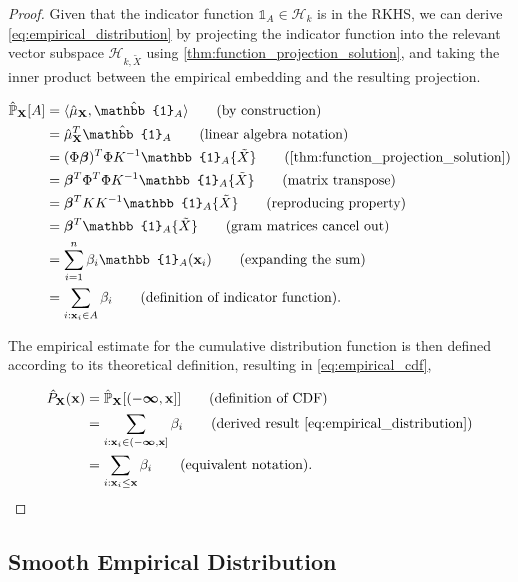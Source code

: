 \documentclass[twoside]{article} \usepackage{aistats2017}
\theoremstyle{definition}
\theoremstyle{theorem}
\newcommand{\rv}[1]{{#1}}
\newcommand{\ds}[1]{\tilde{#1}}
\newcommand{\inner}[2]{{\langle #1, #2 \rangle}}
\begin{document}
		\begin{proof}
			Given that the indicator function $\mathbb{1}_{A} \in \mathcal{H}_{k}$ is in the RKHS, we can derive \eqref{eq:empirical_distribution} by projecting the indicator function into the relevant vector subspace $\mathcal{H}_{k, \ds{X}}$ using \cref{thm:function_projection_solution}, and taking the inner product between the empirical embedding and the resulting projection. 

			\begin{align*}
				\hat{\mathbb{P}}_{\bvec{\rv{X}}}[A] &= \inner{\hat{\mu}_{\bvec{\rv{X}}}}{ \hat{\mathbb{1}}_{A}} \tag{by construction} \\
				&= \hat{\mu}_{\bvec{\rv{X}}}^{T}\hat{\mathbb{1}}_{A} \tag{linear algebra notation} \\
				&= (\Phi \bm{\beta})^{T} \Phi K^{-1} \mathbb{1}_{A}\{\ds{X}\} \tag{\cref{thm:function_projection_solution}} \\
				&= \bm{\beta}^{T} \Phi^{T} \Phi K^{-1} \mathbb{1}_{A}\{\ds{X}\} \tag{matrix transpose} \\
				&= \bm{\beta}^{T} K K^{-1} \mathbb{1}_{A}\{\ds{X}\} \tag{reproducing property} \\
				&= \bm{\beta}^{T} \mathbb{1}_{A}\{\ds{X}\} \tag{gram matrices cancel out} \\
				&= \sum_{i = 1}^{n} \beta_{i} \mathbb{1}_{A}(\bvec{x}_{i}) \tag{expanding the sum} \\
				&= \sum_{i : \bvec{x}_{i} \in A} \beta_{i} \tag{definition of indicator function}.
			\end{align*}

			The empirical estimate for the cumulative distribution function is then defined according to its theoretical definition, resulting in \eqref{eq:empirical_cdf},

			\begin{align*}
				\hat{P}_{\bvec{\rv{X}}}(\bvec{x}) &= \hat{\mathbb{P}}_{\bvec{\rv{X}}}[(-\bm{\infty}, \bvec{x}]] \tag{definition of CDF} \\
				&= \sum_{i : \bvec{x}_{i} \in (-\bm{\infty}, \bvec{x}]} \beta_{i} \tag{derived result \eqref{eq:empirical_distribution}}\\
				&= \sum_{i : \bvec{x}_{i} \leq \bvec{x}} \beta_{i} \tag{equivalent notation}.
			\end{align*}
		\end{proof}
		
	\subsection{Smooth Empirical Distribution}
	\label{sec:direct_quantile_regression:smooth_empirical_distribution}
		
\end{document}
